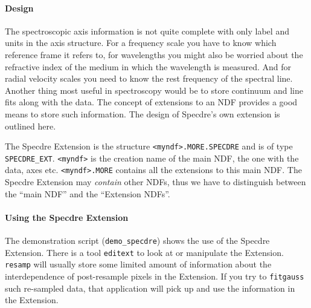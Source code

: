 \documentclass[11pt,twoside]{article}
\newcommand{\htmlref}[2]{#1}
\newcommand{\xref}[3]{#1}
\newcommand{\xlabel}[1]{}
\begin{document}

\paragraph{Design}

   The spectroscopic axis information is not quite complete with only
   label and units in the axis structure. For a frequency scale you have
   to know which reference frame it refers to, for wavelengths you might
   also be worried about the refractive index of the medium in which the
   wavelength is measured. And for radial velocity scales you need to
   know the rest frequency of the spectral line. Another thing most
   useful in spectroscopy would be to store continuum and line fits
   along with the data. The concept of
\xref{extensions to an NDF}{sun33}{extensions}
   provides a
   good means to store such information. The design of Specdre's own
   extension is outlined here.

   The Specdre Extension is the structure {\tt <myndf>.MORE.SPECDRE} and
   is of type {\tt SPECDRE\_EXT}. {\tt <myndf>} is the creation name of
   the main NDF, the one with the data, axes etc. {\tt <myndf>.MORE}
   contains all the extensions to this main NDF. The Specdre Extension
   may {\it contain} other NDFs, thus we have to distinguish between the
   ``main NDF'' and the ``Extension NDFs''.


\paragraph{\label{specdreextens}\xlabel{specdreextens}Using the Specdre Extension}

   The demonstration script (\texttt{demo\_specdre}) shows the use of the
   Specdre Extension.  There is a tool
{\tt\htmlref{editext}{EDITEXT}} to look at or manipulate the
   Extension. {\tt resamp} will usually store some limited amount of
   information about the interdependence of post-resample pixels in the
   Extension. If you try to {\tt fitgauss} such re-sampled data, that
   application will pick up and use the information in the Extension.
\end{document}
